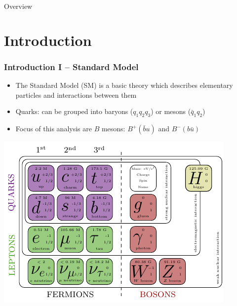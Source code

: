 \documentclass[serif]{beamer}
\begin{document}
\newcommand\tocforsect[2]{%
	\begingroup
	\edef\safesection{\thesection}
	\setcounter{section}{#1}
	\tableofcontents[#2,currentsection]
	\setcounter{section}{\safesection}
	\endgroup
}


\begin{frame}[t]{Overview}
\only<1>{\tocforsect{1}{sectionstyle=shaded,subsectionstyle=shaded}}
\end{frame}

\section{Introduction} 

\begin{frame}[t]
\frametitle{Introduction I -- Standard Model}
\small
\vspace{-3mm}
\begin{block}{}
	\begin{itemize}
		\item The Standard Model (SM) is a basic theory which describes elementary particles and interactions between them
		\item Quarks: can be grouped into baryons ($q_1q_2q_3$) or mesons ($\bar q_1 q_2$)
		\item Focus of this analysis are $B$ mesons: $B^+(\bar b u)$ and $B^-(b \bar u)$
	\end{itemize}
\end{block}

\begin{center}
\includegraphics[scale=0.9]{texfig/SM}
\end{center}
\end{frame}
\end{document}
